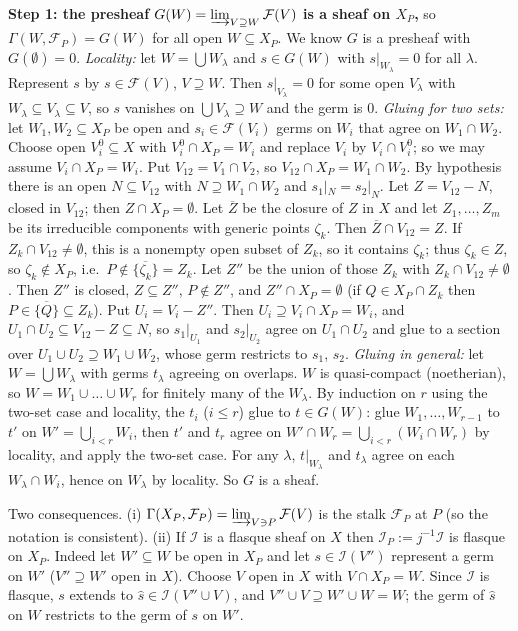 \documentclass[11pt]{article}
\begin{document}
\textbf{Step 1: the presheaf $G(W)=\varinjlim_{V\supseteq W}\mathcal F(V)$ is a sheaf on $X_P$,} so $\Gamma(W,\mathcal F_P)=G(W)$ for all open $W\subseteq X_P$. We know $G$ is a presheaf with $G(\emptyset)=0$. \emph{Locality:} let $W=\bigcup W_\lambda$ and $s\in G(W)$ with $s|_{W_\lambda}=0$ for all $\lambda$. Represent $s$ by $s\in\mathcal F(V)$, $V\supseteq W$. Then $s|_{V_\lambda}=0$ for some open $V_\lambda$ with $W_\lambda\subseteq V_\lambda\subseteq V$, so $s$ vanishes on $\bigcup V_\lambda\supseteq W$ and the germ is $0$. \emph{Gluing for two sets:} let $W_1,W_2\subseteq X_P$ be open and $s_i\in\mathcal F(V_i)$ germs on $W_i$ that agree on $W_1\cap W_2$. Choose open $V_i^0\subseteq X$ with $V_i^0\cap X_P=W_i$ and replace $V_i$ by $V_i\cap V_i^0$; so we may assume $V_i\cap X_P=W_i$. Put $V_{12}=V_1\cap V_2$, so $V_{12}\cap X_P=W_1\cap W_2$. By hypothesis there is an open $N\subseteq V_{12}$ with $N\supseteq W_1\cap W_2$ and $s_1|_N=s_2|_N$. Let $Z=V_{12}-N$, closed in $V_{12}$; then $Z\cap X_P=\emptyset$. Let $\overline Z$ be the closure of $Z$ in $X$ and let $Z_1,\dots,Z_m$ be its irreducible components with generic points $\zeta_k$. Then $\overline Z\cap V_{12}=Z$. If $Z_k\cap V_{12}\ne\emptyset$, this is a nonempty open subset of $Z_k$, so it contains $\zeta_k$; thus $\zeta_k\in Z$, so $\zeta_k\notin X_P$, i.e.\ $P\notin\overline{\{\zeta_k\}}=Z_k$. Let $Z''$ be the union of those $Z_k$ with $Z_k\cap V_{12}\ne\emptyset$. Then $Z''$ is closed, $Z\subseteq Z''$, $P\notin Z''$, and $Z''\cap X_P=\emptyset$ (if $Q\in X_P\cap Z_k$ then $P\in\overline{\{Q\}}\subseteq Z_k$). Put $U_i=V_i-Z''$. Then $U_i\supseteq V_i\cap X_P=W_i$, and $U_1\cap U_2\subseteq V_{12}-Z\subseteq N$, so $s_1|_{U_1}$ and $s_2|_{U_2}$ agree on $U_1\cap U_2$ and glue to a section over $U_1\cup U_2\supseteq W_1\cup W_2$, whose germ restricts to $s_1$, $s_2$. \emph{Gluing in general:} let $W=\bigcup W_\lambda$ with germs $t_\lambda$ agreeing on overlaps. $W$ is quasi-compact (noetherian), so $W=W_1\cup\dots\cup W_r$ for finitely many of the $W_\lambda$. By induction on $r$ using the two-set case and locality, the $t_i$ ($i\le r$) glue to $t\in G(W)$: glue $W_1,\dots,W_{r-1}$ to $t'$ on $W'=\bigcup_{i<r}W_i$, then $t'$ and $t_r$ agree on $W'\cap W_r=\bigcup_{i<r}(W_i\cap W_r)$ by locality, and apply the two-set case. For any $\lambda$, $t|_{W_\lambda}$ and $t_\lambda$ agree on each $W_\lambda\cap W_i$, hence on $W_\lambda$ by locality. So $G$ is a sheaf.

Two consequences. (i) $\Gamma(X_P,\mathcal F_P)=\varinjlim_{V\ni P}\mathcal F(V)$ is the stalk $\mathcal F_P$ at $P$ (so the notation is consistent). (ii) If $\mathcal I$ is a flasque sheaf on $X$ then $\mathcal I_P:=j^{-1}\mathcal I$ is flasque on $X_P$. Indeed let $W'\subseteq W$ be open in $X_P$ and let $s\in\mathcal I(V'')$ represent a germ on $W'$ ($V''\supseteq W'$ open in $X$). Choose $V$ open in $X$ with $V\cap X_P=W$. Since $\mathcal I$ is flasque, $s$ extends to $\hat s\in\mathcal I(V''\cup V)$, and $V''\cup V\supseteq W'\cup W=W$; the germ of $\hat s$ on $W$ restricts to the germ of $s$ on $W'$.
\end{document}
